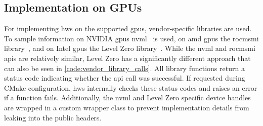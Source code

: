 \subsection{Implementation on GPUs}
\label{sec:hws_impl_gpus}

For implementing hws on the supported \glspl{gpu}, vendor-specific libraries are used. 
To sample information on NVIDIA \glspl{gpu} \gls{nvml}~\cite{nvidia_nvml_2024} is used, on \gls{amd} \glspl{gpu} the \gls{rocmsmi} library~\cite{amd_rocm_2024}, and on Intel \glspl{gpu} the Level Zero library~\cite{intel_level_2024}. 
While the \gls{nvml} and \gls{rocmsmi} \glspl{api} are relatively similar, Level Zero has a significantly different approach that can also be seen in \autoref{code:vendor_library_calls}. 
All library functions return a status code indicating whether the \gls{api} call was successful. 
If requested during CMake configuration, hws internally checks these status codes and raises an error if a function fails.  
Additionally, the \gls{nvml} and Level Zero specific device handles are wrapped in a custom wrapper class to prevent implementation details from leaking into the public headers. 

